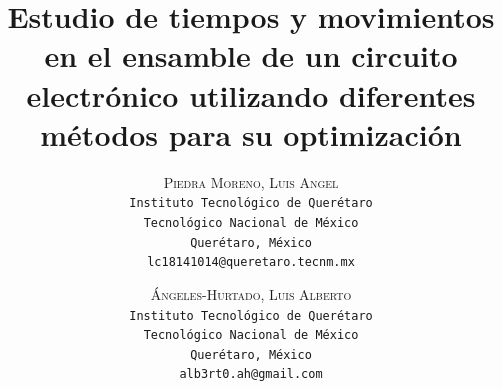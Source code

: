     \lfoot{ \thepage}
    
    \setlength{\droptitle}{-5\baselineskip} %
    \title{\textbf{Estudio de tiempos y movimientos en el ensamble de un circuito electrónico utilizando diferentes métodos para su optimización }} %
    
     \author{ 
     \textsc{Piedra Moreno, Luis Angel}\\ 
     \texttt{ Instituto Tecnológico de Querétaro } \\ 
     \texttt{ Tecnológico Nacional de México } \\ 
     \texttt{Querétaro, México}\\ 
     \texttt{lc18141014@queretaro.tecnm.mx} 
     \and 
     \textsc{Ángeles-Hurtado, Luis Alberto}\\ 
     \texttt{ Instituto Tecnológico de Querétaro } \\ 
     \texttt{ Tecnológico Nacional de México } \\ 
     \texttt{Querétaro, México}\\ 
     \texttt{alb3rt0.ah@gmail.com} 
    }
    
    
    
    
